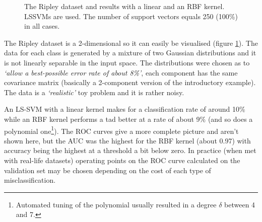 \begin{figure}[htp]
\centering
{}\hfil
{}\hfil
{}\hfil
\caption{The Ripley dataset and results with a linear and an RBF kernel. LSSVMs are used. The number of support vectors equals 250 (100\%) in all cases.}
\label{ripley}
\end{figure}

The Ripley dataset is a 2-dimensional so it can easily be visualised (figure \ref{ripley}). The data for each class is generated by a mixture of two Gaussian distributions and it is not linearly separable in the input space. The distributions were chosen as to \textit{`allow a best-possible error rate of about 8\%'}, each component has the same covariance matrix (basically a 2-component version of the introductory example). The data is a \textit{`realistic'} toy problem and it is rather noisy.

\par An LS-SVM with a linear kernel makes for a classification rate of around 10\% while an RBF kernel performs a tad better at a rate of about 9\% (and so does a polynomial one\footnote{Automated tuning of the polynomial usually resulted in a degree $\delta$ between 4 and 7.}). The ROC curves give a more complete picture and aren't shown here, but the AUC was the highest for the RBF kernel (about 0.97) with accuracy being the highest at a threshold a bit below zero. In practice (when met with real-life datasets) operating points on the ROC curve calculated on the validation set may be chosen depending on the cost of each type of misclassification.

